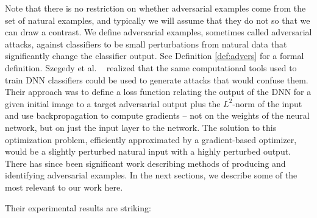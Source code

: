 Note that there is no restriction on whether adversarial examples come from the set of natural examples, and typically we will assume that they do not so that we can draw a contrast. 
We define adversarial examples, sometimes called adversarial attacks, against classifiers
to be small perturbations from natural data that significantly change the classifier output. See Definition \ref{def:advers} for a formal definition.
Szegedy et al. 
~\cite{Szegedy2013} realized that the same computational tools
used to train DNN classifiers could be used to generate attacks that would
confuse them. Their approach was to define a loss function
relating the output of the DNN for a given initial image to a target adversarial 
output plus the $L^2$-norm of the input and use backpropagation to 
compute gradients -- not on the weights of the neural network, but on
just the input layer to the network. The solution to this optimization
problem, efficiently approximated by a gradient-based optimizer, would
be a slightly perturbed natural input with a highly perturbed
output. There has since been significant work describing methods of producing and identifying
adversarial examples. In the next sections, we describe some of the most relevant
to our work here.

Their experimental results are striking:\\

